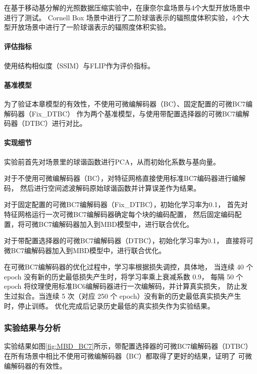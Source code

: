 在基于移动基分解的光照数据压缩实验中，在康奈尔盒场景与4个大型开放场景中进行了测试。
Cornell Box 场景中进行了二阶球谐表示的辐照度体积实验，4个大型开放场景中进行了一阶球谐表示的辐照度体积实验。

\paragraph{评估指标}

使用结构相似度（SSIM）与FLIP作为评价指标。

\paragraph{基准模型}

为了验证本章模型的有效性，不使用可微编解码器（BC）、固定配置的可微BC7编解码器（Fix\_DTBC）
作为两个基准模型，与使用带配置选择器的可微BC7编解码器（DTBC）进行对比。

\paragraph{实现细节}

实验前首先对场景里的球谐函数进行PCA，从而初始化系数与基向量。

对于不使用可微编解码器（BC），对特征网格直接使用标准BC7编码器进行编解码，
然后进行空间滤波解码原始球谐函数并计算误差作为结果。

对于固定配置的可微BC7编解码器（Fix\_DTBC），初始化学习率为0.1，
首先对特征网格运行一次可微BC7编解码器确定每个块的编码配置，
然后固定编码配置，将可微BC7编解码器加入到MBD模型中，进行联合优化。

对于带配置选择器的可微BC7编解码器（DTBC），初始化学习率为0.1，
直接将可微BC7编解码器加入到MBD模型中，进行联合优化。

在可微BC7编解码器的优化过程中，学习率根据损失调控，具体地，
当连续 40 个 epoch 没有新的历史最低损失产生时，将学习率乘上衰减系数 0.9，
每隔 50 个 epoch 将纹理使用标准BC6编解码器进行一次编解码，并计算真实损失，
防止发生过拟合。当连续 5 次（对应 250 个 epoch）没有新的历史最低真实损失产生时，停止训练。
优化完成后记录历史最低的真实损失作为实验结果。

\subsubsection{实验结果与分析}

实验结果如图\ref{fig:MBD_BC7}所示，带配置选择器的可微BC7编解码器（DTBC）
在所有场景中相比不使用可微编解码器（BC）都取得了更好的结果，证明了
可微编解码器的有效性。

